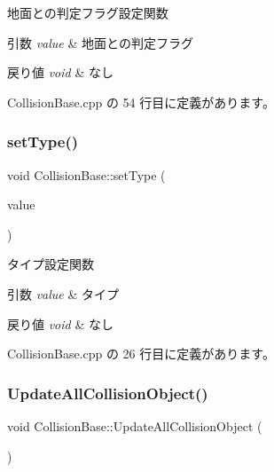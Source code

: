 地面との判定フラグ設定関数 


\begin{DoxyParams}{引数}
{\em value} & 地面との判定フラグ \\
\hline
\end{DoxyParams}

\begin{DoxyRetVals}{戻り値}
{\em void} & なし \\
\hline
\end{DoxyRetVals}


 Collision\+Base.\+cpp の 54 行目に定義があります。

\mbox{\label{class_collision_base_ada12dae7057600b363751efa910050f4}} 
\subsubsection{\texorpdfstring{set\+Type()}{setType()}}
{\footnotesize\ttfamily void Collision\+Base\+::set\+Type (\begin{DoxyParamCaption}\item[{\mbox{\hyperlink{class_collision_base_a18dc0d5461742083ca12013fe9ff1a20}{Collision\+Base\+::\+Type}}}]{value }\end{DoxyParamCaption})}



タイプ設定関数 


\begin{DoxyParams}{引数}
{\em value} & タイプ \\
\hline
\end{DoxyParams}

\begin{DoxyRetVals}{戻り値}
{\em void} & なし \\
\hline
\end{DoxyRetVals}


 Collision\+Base.\+cpp の 26 行目に定義があります。

\mbox{\label{class_collision_base_af3e5d72e65eec844ca7e93ca01549c16}} 
\subsubsection{\texorpdfstring{Update\+All\+Collision\+Object()}{UpdateAllCollisionObject()}}
{\footnotesize\ttfamily void Collision\+Base\+::\+Update\+All\+Collision\+Object (\begin{DoxyParamCaption}{ }\end{DoxyParamCaption})}




